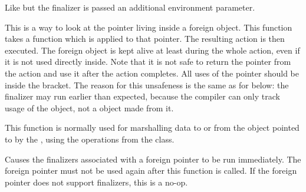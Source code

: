 \begin{haddockdesc}
\item[\begin{tabular}{@{}l}
addForeignPtrFinalizerEnv :: FinalizerEnvPtr env a -> Ptr env -> ForeignPtr a -> IO ()
\end{tabular}]
{\haddockbegindoc
Like  but the finalizer is passed an additional
 environment parameter.\par}
\end{haddockdesc}
\begin{haddockdesc}
\item[\begin{tabular}{@{}l}
withForeignPtr :: ForeignPtr a -> (Ptr a -> IO b) -> IO b
\end{tabular}]
{\haddockbegindoc
This is a way to look at the pointer living inside a
 foreign object.  This function takes a function which is
 applied to that pointer. The resulting  action is then
 executed. The foreign object is kept alive at least during
 the whole action, even if it is not used directly
 inside. Note that it is not safe to return the pointer from
 the action and use it after the action completes. All uses
 of the pointer should be inside the
  bracket.  The reason for
 this unsafeness is the same as for
  below: the finalizer
 may run earlier than expected, because the compiler can only
 track usage of the  object, not
 a  object made from it.\par
This function is normally used for marshalling data to
 or from the object pointed to by the
 , using the operations from the
  class.\par}
\end{haddockdesc}
\begin{haddockdesc}
\item[\begin{tabular}{@{}l}
finalizeForeignPtr :: ForeignPtr a -> IO ()
\end{tabular}]
{\haddockbegindoc
Causes the finalizers associated with a foreign pointer to be run
 immediately. The foreign pointer must not be used again after this
 function is called. If the foreign pointer does not support finalizers,
 this is a no-op.\par}
\end{haddockdesc}
